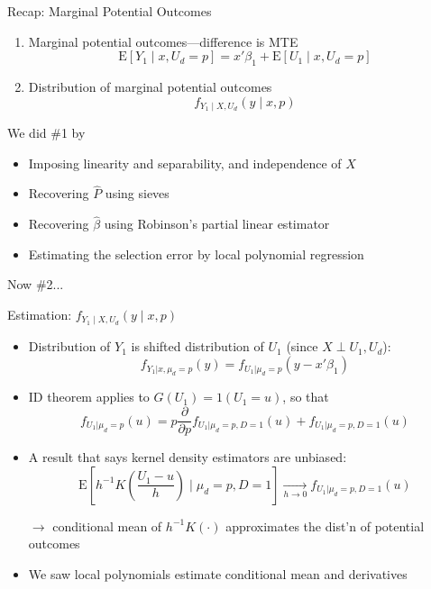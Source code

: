 \documentclass{beamer}
\begin{document}
\begin{frame}{Recap:  Marginal Potential Outcomes}
\begin{enumerate}
\item Marginal potential outcomes---difference is MTE
\begin{equation*}
  \mathrm{E}[Y_1\mid x,U_d=p] = x'\beta_1 +
  \mathrm{E}[U_1\mid x,U_d=p]
\end{equation*}
\item Distribution of marginal potential outcomes
  \begin{equation*}
    f_{Y_1\mid X,U_d}(y\mid x,p)
  \end{equation*}
\end{enumerate}

We did \#1 by
\begin{itemize}
\item Imposing linearity and separability, and independence of $X$
\item Recovering $\hat{P}$ using sieves
\item Recovering $\hat{\beta}$ using Robinson's partial linear
  estimator
\item Estimating the selection error by local polynomial regression
\end{itemize}
Now \#2...

\end{frame}

\begin{frame}{Estimation: $f_{Y_1\mid X,U_d}(y\mid x,p)$}
  \begin{itemize}
\item Distribution of $Y_1$ is shifted distribution of $U_1$ (since  $X \perp U_1,U_d$):
\begin{equation*}
  f_{Y_1|x,\mu_d=p}(y) = f_{U_1|\mu_d=p}(y-x'\beta_1)
\end{equation*}

\item ID theorem applies to $G(U_1)=1(U_1=u)$, so that
  \begin{equation*}
    f_{U_1|\mu_d=p}(u) = p \frac{\partial}{\partial
    p}f_{U_1|\mu_d=p,D=1}(u) + f_{U_1|\mu_d=p,D=1}(u)
  \end{equation*}
\item A result that says kernel density estimators are unbiased:
  \begin{equation*}
    \mathrm{E}\left[h^{-1}K\left(\frac{U_1-u}{h}\right)\mid \mu_d=p,
      D=1\right]\xrightarrow[h \rightarrow 0]{} f_{U_1|\mu_d=p,D=1}(u)
  \end{equation*}
  
$\rightarrow$ conditional mean of
  $h^{-1}K(\cdot)$ approximates the dist'n of potential outcomes

  \item We saw local polynomials estimate conditional mean and derivatives
  \end{itemize}

\end{frame}
\end{document}
